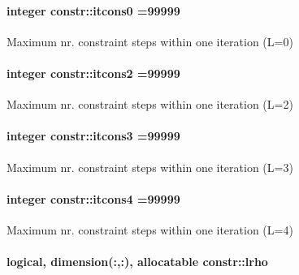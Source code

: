 \paragraph[{\texorpdfstring{itcons0}{itcons0}}]{\setlength{\rightskip}{0pt plus 5cm}integer constr\+::itcons0 =99999}\hypertarget{namespaceconstr_a3d32b892a876bc95ceb84d5fd4a08d73}{}\label{namespaceconstr_a3d32b892a876bc95ceb84d5fd4a08d73}


Maximum nr. constraint steps within one iteration (L=0) 

\paragraph[{\texorpdfstring{itcons2}{itcons2}}]{\setlength{\rightskip}{0pt plus 5cm}integer constr\+::itcons2 =99999}\hypertarget{namespaceconstr_a30f4c618301cfa861b28f20f3c5cb81d}{}\label{namespaceconstr_a30f4c618301cfa861b28f20f3c5cb81d}


Maximum nr. constraint steps within one iteration (L=2) 

\paragraph[{\texorpdfstring{itcons3}{itcons3}}]{\setlength{\rightskip}{0pt plus 5cm}integer constr\+::itcons3 =99999}\hypertarget{namespaceconstr_a4afb13fcfc904a320758247b7d5b06ea}{}\label{namespaceconstr_a4afb13fcfc904a320758247b7d5b06ea}


Maximum nr. constraint steps within one iteration (L=3) 

\paragraph[{\texorpdfstring{itcons4}{itcons4}}]{\setlength{\rightskip}{0pt plus 5cm}integer constr\+::itcons4 =99999}\hypertarget{namespaceconstr_a863a7bff97cfb37f8ca4b42156a89e84}{}\label{namespaceconstr_a863a7bff97cfb37f8ca4b42156a89e84}


Maximum nr. constraint steps within one iteration (L=4) 

\paragraph[{\texorpdfstring{lrho}{lrho}}]{\setlength{\rightskip}{0pt plus 5cm}logical, dimension(\+:,\+:), allocatable constr\+::lrho}\hypertarget{namespaceconstr_acc27ba959f19761e554a08b943b4a8d2}{}\label{namespaceconstr_acc27ba959f19761e554a08b943b4a8d2}


